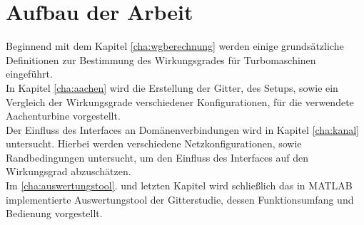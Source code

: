 \section*{Aufbau der Arbeit}
Beginnend mit dem Kapitel \ref{cha:wgberechnung} werden einige grundsätzliche Definitionen zur Bestimmung des Wirkungsgrades für Turbomaschinen eingeführt.\\
In Kapitel \ref{cha:aachen} wird die Erstellung der Gitter, des Setups, sowie ein Vergleich der Wirkungsgrade verschiedener Konfigurationen, für die verwendete Aachenturbine vorgestellt.\\
Der Einfluss des Interfaces an Domänenverbindungen wird in Kapitel \ref{cha:kanal} untersucht. Hierbei werden verschiedene Netzkonfigurationen, sowie Randbedingungen untersucht, um den Einfluss des Interfaces auf den Wirkungsgrad abzuschätzen.\\
Im \ref{cha:auswertungstool}. und letzten Kapitel wird schließlich das in MATLAB implementierte Auswertungstool der Gitterstudie, dessen Funktionsumfang und Bedienung vorgestellt. 